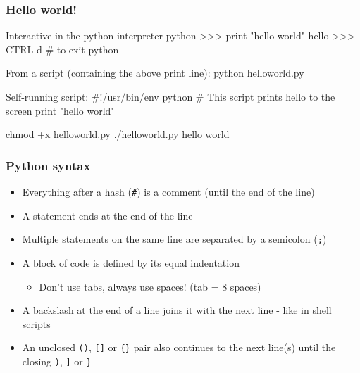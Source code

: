 \documentclass[hyperref={colorlinks=true}]{beamer}
\begin{document}
\begin{frame}[fragile]
  \frametitle{Hello world!}

  \begin{ucpythonblock}{Interactive in the python interpreter}
python
>>> print "hello world"
hello
>>> CTRL-d  # to exit python
  \end{ucpythonblock}
  
  \begin{ucpythonblock}{From a script (containing the above print line):}
python helloworld.py
  \end{ucpythonblock}
  
  \begin{ucpythonblock}{Self-running script:}
#!/usr/bin/env python
# This script prints hello to the screen
print "hello world"
  \end{ucpythonblock}
  
  \begin{ucpythonblock}{}
chmod +x helloworld.py
./helloworld.py
hello world
  \end{ucpythonblock}
  
\end{frame}


\begin{frame}[fragile]
  \frametitle{Python syntax}

  \begin{itemize}
    \item Everything after a hash (\texttt{\#}) is a comment (until the end of the line)
    \item A statement ends at the end of the line
    \item Multiple statements on the same line are separated by a semicolon (\texttt{;})
    \item A block of code is defined by its equal indentation
    \begin{itemize}
       \item Don't use tabs, always use spaces! (tab = 8 spaces)
    \end{itemize}
    \item A backslash at the end of a line joins it with the next line - like in shell scripts
    \item An unclosed \texttt{()}, \texttt{[]} or \texttt{\{\}} pair also continues to the next line(s) until the closing \texttt{)}, \texttt{]} or \texttt{\}}
  \end{itemize}
  
\end{frame}
\end{document}
